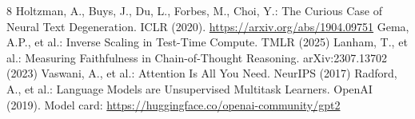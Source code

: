 \documentclass[runningheads]{llncs}
\begin{document}
\begin{thebibliography}{8}
 Holtzman, A., Buys, J., Du, L., Forbes, M., Choi, Y.: The Curious Case of Neural Text Degeneration. ICLR (2020). \url{https://arxiv.org/abs/1904.09751}
 Gema, A.P., et al.: Inverse Scaling in Test-Time Compute. TMLR (2025)
 Lanham, T., et al.: Measuring Faithfulness in Chain-of-Thought Reasoning. arXiv:2307.13702 (2023)
 Vaswani, A., et al.: Attention Is All You Need. NeurIPS (2017)
 Radford, A., et al.: Language Models are Unsupervised Multitask Learners. OpenAI (2019). Model card: \url{https://huggingface.co/openai-community/gpt2}
\end{thebibliography}
\end{document}

